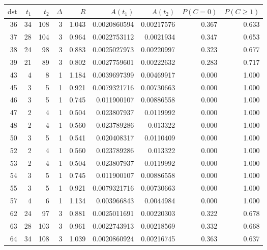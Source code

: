 \begin{tabular}{r r r r r r r r r}
\toprule
$\mathrm{dst}$ & $t_1$ & $t_2$ & $\Delta$ & $R$ & $A(t_1)$ & $A(t_2)$ & $P(C=0)$ & $P(C\ge1)$ \\
\midrule
36 & 34 & 108 & 3 & 1.043 & 0.0020860594 & 0.00217576 & 0.367 & 0.633 \\
37 & 28 & 104 & 3 & 0.964 & 0.0022753112 & 0.0021934 & 0.347 & 0.653 \\
38 & 24 & 98 & 3 & 0.883 & 0.0025027973 & 0.00220997 & 0.323 & 0.677 \\
39 & 21 & 89 & 3 & 0.802 & 0.0027759601 & 0.00222632 & 0.283 & 0.717 \\
43 & 4 & 8 & 1 & 1.184 & 0.0039697399 & 0.00469917 & 0.000 & 1.000 \\
45 & 3 & 5 & 1 & 0.921 & 0.0079321716 & 0.00730663 & 0.000 & 1.000 \\
46 & 3 & 5 & 1 & 0.745 & 0.011900107 & 0.00886558 & 0.000 & 1.000 \\
47 & 2 & 4 & 1 & 0.504 & 0.023807937 & 0.0119992 & 0.000 & 1.000 \\
48 & 2 & 4 & 1 & 0.560 & 0.023789286 & 0.013322 & 0.000 & 1.000 \\
50 & 3 & 5 & 1 & 0.541 & 0.020408317 & 0.0110409 & 0.000 & 1.000 \\
52 & 2 & 4 & 1 & 0.560 & 0.023789286 & 0.013322 & 0.000 & 1.000 \\
53 & 2 & 4 & 1 & 0.504 & 0.023807937 & 0.0119992 & 0.000 & 1.000 \\
54 & 3 & 5 & 1 & 0.745 & 0.011900107 & 0.00886558 & 0.000 & 1.000 \\
55 & 3 & 5 & 1 & 0.921 & 0.0079321716 & 0.00730663 & 0.000 & 1.000 \\
57 & 4 & 6 & 1 & 1.134 & 0.003966843 & 0.0044984 & 0.000 & 1.000 \\
62 & 24 & 97 & 3 & 0.881 & 0.0025011691 & 0.00220303 & 0.322 & 0.678 \\
63 & 28 & 103 & 3 & 0.961 & 0.0022743913 & 0.00218569 & 0.332 & 0.668 \\
64 & 34 & 108 & 3 & 1.039 & 0.0020860924 & 0.00216745 & 0.363 & 0.637 \\
\bottomrule
\end{tabular}
